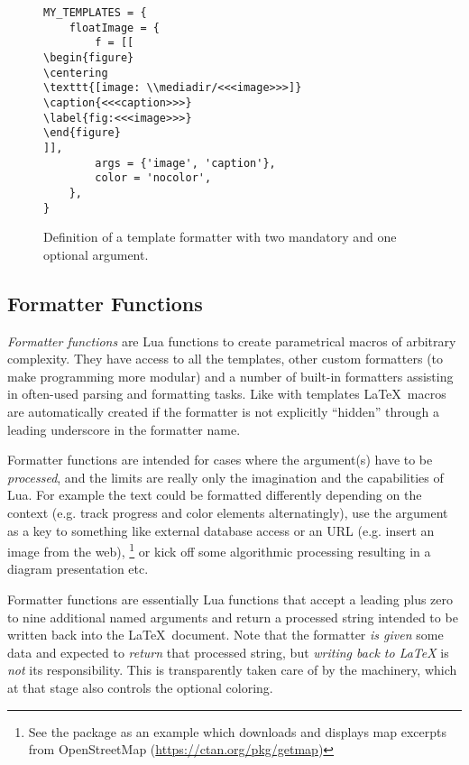 \documentclass{scrartcl}
\begin{document}
\begin{figure}
\begin{verbatim}
MY_TEMPLATES = {
    floatImage = {
        f = [[
\begin{figure}
\centering
\texttt{[image: \\mediadir/<<<image>>>]}
\caption{<<<caption>>>}
\label{fig:<<<image>>>}
\end{figure}
]],
        args = {'image', 'caption'},
        color = 'nocolor',
    },
}
\end{verbatim}
\caption{Definition of a template formatter with two mandatory and one optional argument.}
\label{fig:template}
\end{figure}




\subsection{Formatter Functions}
\label{sec:formatter-functions}

\emph{Formatter functions} are Lua functions to create parametrical macros of
arbitrary complexity.  They have access to all the templates, other custom
formatters (to make programming more modular) and a number of built-in
formatters assisting in often-used parsing and formatting tasks.  Like with
templates \LaTeX\ macros are automatically created if the formatter is not
explicitly “hidden” through a leading underscore in the formatter name.

Formatter functions are intended for cases where the argument(s) have to be
\emph{processed}, and the limits are really only the imagination and the
capabilities of Lua.  For example the text could be formatted differently
depending on the context (e.g. track progress and color elements alternatingly),
use the argument as a key to something like external database access or an
URL (e.g. insert an image from the web),%
\footnote{See the  package as an example which downloads and
displays map excerpts from OpenStreetMap (\url{https://ctan.org/pkg/getmap})} %
or kick off some algorithmic processing resulting in a diagram presentation etc.

\medskip

Formatter functions are essentially Lua functions that accept a leading
 plus zero to nine additional named arguments and return a
processed string intended to be written back into the \LaTeX\ document.  Note
that the formatter \emph{is given} some data and expected to \emph{return} that
processed string, but \emph{writing back to \LaTeX} is \emph{not} its
responsibility.  This is transparently taken care of by the
 machinery, which at that stage also controls the optional
coloring.
\end{document}
